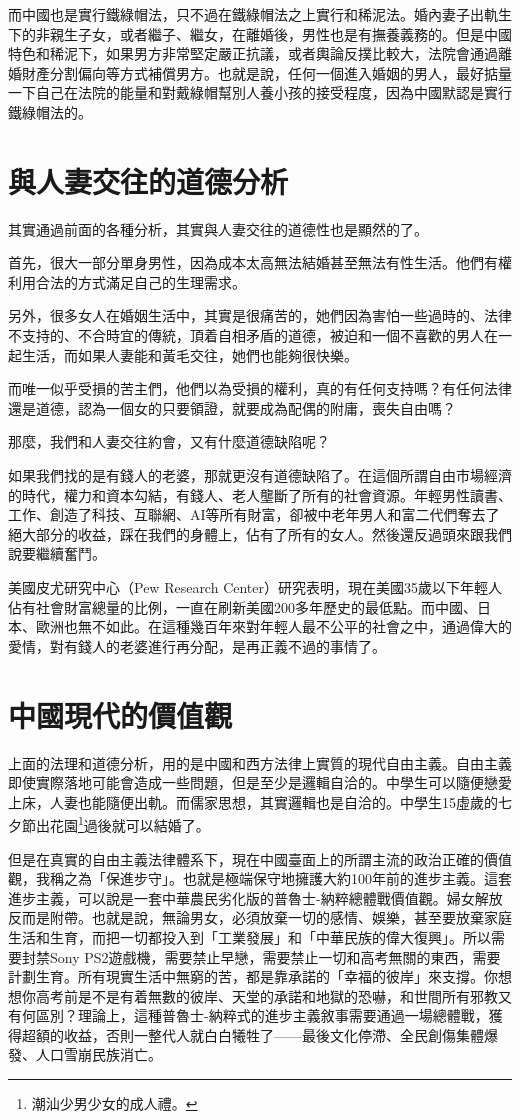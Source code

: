 而中國也是實行鐵綠帽法，只不過在鐵綠帽法之上實行和稀泥法。婚內妻子出軌生下的非親生子女，或者繼子、繼女，在離婚後，男性也是有撫養義務的。但是中國特色和稀泥下，如果男方非常堅定嚴正抗議，或者輿論反撲比較大，法院會通過離婚財產分割偏向等方式補償男方。也就是說，任何一個進入婚姻的男人，最好掂量一下自己在法院的能量和對戴綠帽幫別人養小孩的接受程度，因為中國默認是實行鐵綠帽法的。

\section{與人妻交往的道德分析}

其實通過前面的各種分析，其實與人妻交往的道德性也是顯然的了。

首先，很大一部分單身男性，因為成本太高無法結婚甚至無法有性生活。他們有權利用合法的方式滿足自己的生理需求。

另外，很多女人在婚姻生活中，其實是很痛苦的，她們因為害怕一些過時的、法律不支持的、不合時宜的傳統，頂着自相矛盾的道德，被迫和一個不喜歡的男人在一起生活，而如果人妻能和黃毛交往，她們也能夠很快樂。

而唯一似乎受損的苦主們，他們以為受損的權利，真的有任何支持嗎？有任何法律還是道德，認為一個女的只要領證，就要成為配偶的附庸，喪失自由嗎？

那麼，我們和人妻交往約會，又有什麼道德缺陷呢？

如果我們找的是有錢人的老婆，那就更沒有道德缺陷了。在這個所謂自由市場經濟的時代，權力和資本勾結，有錢人、老人壟斷了所有的社會資源。年輕男性讀書、工作、創造了科技、互聯網、AI等所有財富，卻被中老年男人和富二代們奪去了絕大部分的收益，踩在我們的身體上，佔有了所有的女人。然後還反過頭來跟我們說要繼續奮鬥。

美國皮尤研究中心（Pew Research Center）研究表明，現在美國35歲以下年輕人佔有社會財富總量的比例，一直在刷新美國200多年歷史的最低點。而中國、日本、歐洲也無不如此。在這種幾百年來對年輕人最不公平的社會之中，通過偉大的愛情，對有錢人的老婆進行再分配，是再正義不過的事情了。

\section{中國現代的價值觀}

上面的法理和道德分析，用的是中國和西方法律上實質的現代自由主義。自由主義即使實際落地可能會造成一些問題，但是至少是邏輯自洽的。中學生可以隨便戀愛上床，人妻也能隨便出軌。而儒家思想，其實邏輯也是自洽的。中學生15虛歲的七夕節出花園\footnote{潮汕少男少女的成人禮。}過後就可以結婚了。

但是在真實的自由主義法律體系下，現在中國臺面上的所謂主流的政治正確的價值觀，我稱之為「保進步守」。也就是極端保守地擁護大約100年前的進步主義。這套進步主義，可以說是一套中華農民劣化版的普魯士-納粹總體戰價值觀。婦女解放反而是附帶。也就是說，無論男女，必須放棄一切的感情、娛樂，甚至要放棄家庭生活和生育，而把一切都投入到「工業發展」和「中華民族的偉大復興」。所以需要封禁Sony PS2遊戲機，需要禁止早戀，需要禁止一切和高考無關的東西，需要計劃生育。所有現實生活中無窮的苦，都是靠承諾的「幸福的彼岸」來支撐。你想想你高考前是不是有着無數的彼岸、天堂的承諾和地獄的恐嚇，和世間所有邪教又有何區別？理論上，這種普魯士-納粹式的進步主義敘事需要通過一場總體戰，獲得超額的收益，否則一整代人就白白犧牲了——最後文化停滯、全民創傷集體爆發、人口雪崩民族消亡。


